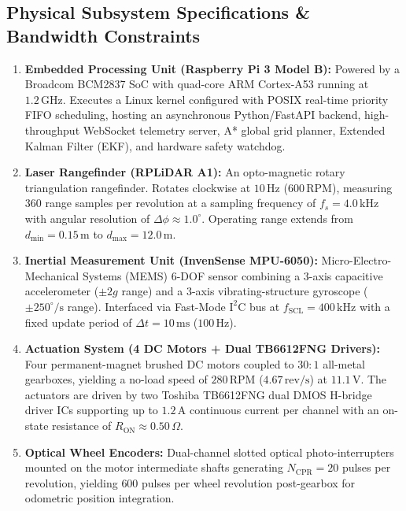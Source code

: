 \documentclass[11pt, a4paper]{article}
\begin{document}
\subsection{Physical Subsystem Specifications \& Bandwidth Constraints}
\begin{enumerate}
    \item \textbf{Embedded Processing Unit (Raspberry Pi 3 Model B):} Powered by a Broadcom BCM2837 SoC with quad-core ARM Cortex-A53 running at $1.2\,\text{GHz}$. Executes a Linux kernel configured with POSIX real-time priority FIFO scheduling, hosting an asynchronous Python/FastAPI backend, high-throughput WebSocket telemetry server, A* global grid planner, Extended Kalman Filter (EKF), and hardware safety watchdog.
    \item \textbf{Laser Rangefinder (RPLiDAR A1):} An opto-magnetic rotary triangulation rangefinder. Rotates clockwise at $10\,\text{Hz}$ ($600\,\text{RPM}$), measuring $360$ range samples per revolution at a sampling frequency of $f_s = 4.0\,\text{kHz}$ with angular resolution of $\Delta \phi \approx 1.0^\circ$. Operating range extends from $d_{\min} = 0.15\,\text{m}$ to $d_{\max} = 12.0\,\text{m}$.
    \item \textbf{Inertial Measurement Unit (InvenSense MPU-6050):} Micro-Electro-Mechanical Systems (MEMS) 6-DOF sensor combining a 3-axis capacitive accelerometer ($\pm 2g$ range) and a 3-axis vibrating-structure gyroscope ($\pm 250^\circ/\text{s}$ range). Interfaced via Fast-Mode $\text{I}^2\text{C}$ bus at $f_{\text{SCL}} = 400\,\text{kHz}$ with a fixed update period of $\Delta t = 10\,\text{ms}$ ($100\,\text{Hz}$).
    \item \textbf{Actuation System (4 DC Motors + Dual TB6612FNG Drivers):} Four permanent-magnet brushed DC motors coupled to $30:1$ all-metal gearboxes, yielding a no-load speed of $280\,\text{RPM}$ ($4.67\,\text{rev/s}$) at $11.1\,\text{V}$. The actuators are driven by two Toshiba TB6612FNG dual DMOS H-bridge driver ICs supporting up to $1.2\,\text{A}$ continuous current per channel with an on-state resistance of $R_{\text{ON}} \approx 0.50\,\Omega$.
    \item \textbf{Optical Wheel Encoders:} Dual-channel slotted optical photo-interrupters mounted on the motor intermediate shafts generating $N_{\text{CPR}} = 20$ pulses per revolution, yielding $600$ pulses per wheel revolution post-gearbox for odometric position integration.
\end{enumerate}
\end{document}
